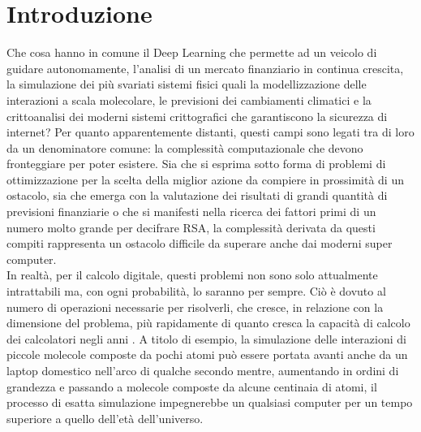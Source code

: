 \documentclass[12pt,a4paper,openright]{report}
\begin{document}
\chapter{Introduzione}
Che cosa hanno in comune il Deep Learning che permette ad un veicolo di guidare autonomamente, l'analisi di un mercato finanziario in continua crescita, la simulazione dei più svariati sistemi fisici 
quali la modellizzazione delle interazioni a scala molecolare, le previsioni dei cambiamenti climatici e la crittoanalisi dei moderni sistemi crittografici che garantiscono la sicurezza di internet?
Per quanto apparentemente distanti, questi campi sono legati tra di loro da un denominatore comune: la complessità computazionale che devono fronteggiare per poter esistere.
Sia che si esprima sotto forma di problemi di ottimizzazione per la scelta della miglior azione da compiere in prossimità di un ostacolo,
sia che emerga con la valutazione dei risultati di grandi quantità di previsioni finanziarie o che si manifesti nella ricerca dei fattori primi di un numero molto grande per decifrare RSA\cite{ref22},
la complessità derivata da questi compiti rappresenta un ostacolo difficile da superare anche dai moderni super computer.\\
In realtà, per il calcolo digitale, questi problemi non sono solo attualmente intrattabili ma, con ogni probabilità, lo saranno per sempre. Ciò è dovuto al numero di operazioni necessarie per risolverli,
che cresce, in relazione con la dimensione del problema, più rapidamente di quanto cresca la capacità di calcolo dei calcolatori negli anni \cite{ref23}.
A titolo di esempio, la simulazione delle interazioni di piccole molecole composte da pochi atomi può essere portata avanti anche da un laptop domestico nell'arco di qualche secondo mentre, aumentando in ordini di grandezza e 
passando a molecole composte da alcune centinaia di atomi, il processo di esatta simulazione impegnerebbe un qualsiasi computer per un tempo superiore a quello dell'età dell'universo.
\end{document}
